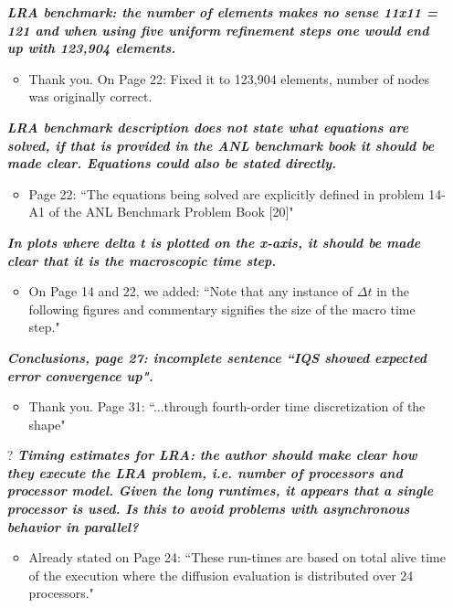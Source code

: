 \documentclass{elsarticle}
\newcommand{\nofix}{?}
\newcommand{\done}{\checkmark}
\newcommand{\easy}[1]{\textbf{\textit{#1}}}
\begin{document}
\begin{itemize}
\item[\done] \easy{ LRA benchmark: the number of elements makes no sense 11x11 = 121 and when using five uniform refinement steps one would end up with 123,904 elements. }
\begin{itemize}
\item Thank you. On Page 22: Fixed it to 123,904 elements, number of nodes was originally correct.
\end{itemize}

\item[\done] \easy{ LRA benchmark description does not state what equations are solved, if that is provided in the ANL benchmark book it should be made clear. Equations could also be stated directly. }
\begin{itemize}
\item  Page 22: ``The equations being solved are explicitly defined in problem 14-A1 of the ANL Benchmark Problem Book [20]"
\end{itemize}

\item[\done] \easy{ In plots where delta t is plotted on the x-axis, it should be made clear that it is the macroscopic time step. }
\begin{itemize}
\item On Page 14 and 22, we added: ``Note that any instance of $\Delta t$ in the following figures and commentary signifies the size of the macro time step."
\end{itemize}

\item[\done] \easy{ Conclusions, page 27: incomplete sentence ``IQS showed expected error convergence up". }
\begin{itemize}
\item Thank you. Page 31: ``...through fourth-order time discretization of the shape"
\end{itemize}

\item[\nofix] \easy{ Timing estimates for LRA: the author should make clear how they execute the LRA problem, i.e. number of processors and processor model. Given the long runtimes, it appears that a single processor is used. Is this to avoid problems with asynchronous behavior in parallel? }
\begin{itemize}
\item Already stated on Page 24: ``These run-times are based on total alive time of the execution where the diffusion evaluation is distributed over 24 processors."
\end{itemize}

\end{itemize}
\end{document}
